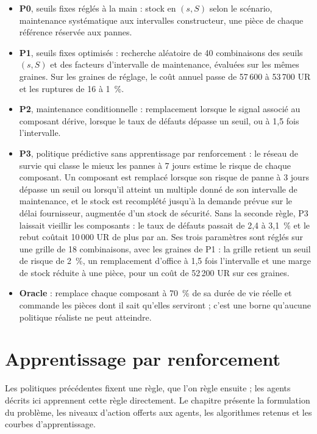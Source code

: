\documentclass[11pt,a4paper,oneside]{report}
\begin{document}
\begin{itemize}
\item \textbf{P0}, seuils fixes réglés à la main : stock en $(s,S)$ selon le scénario, maintenance systématique aux intervalles constructeur, une pièce de chaque référence réservée aux pannes.
\item \textbf{P1}, seuils fixes optimisés : recherche aléatoire de 40 combinaisons des seuils $(s,S)$ et des facteurs d'intervalle de maintenance, évaluées sur les mêmes graines. Sur les graines de réglage, le coût annuel passe de 57\,600 à 53\,700 UR et les ruptures de 16 à 1~\%.
\item \textbf{P2}, maintenance conditionnelle : remplacement lorsque le signal associé au composant dérive, lorsque le taux de défauts dépasse un seuil, ou à 1,5 fois l'intervalle.
\item \textbf{P3}, politique prédictive sans apprentissage par renforcement : le réseau de survie qui classe le mieux les pannes à 7 jours estime le risque de chaque composant. Un composant est remplacé lorsque son risque de panne à 3 jours dépasse un seuil ou lorsqu'il atteint un multiple donné de son intervalle de maintenance, et le stock est recomplété jusqu'à la demande prévue sur le délai fournisseur, augmentée d'un stock de sécurité. Sans la seconde règle, P3 laissait vieillir les composants : le taux de défauts passait de 2,4 à 3,1~\% et le rebut coûtait 10\,000 UR de plus par an. Ses trois paramètres sont réglés sur une grille de 18 combinaisons, avec les graines de P1 : la grille retient un seuil de risque de 2~\%, un remplacement d'office à 1,5 fois l'intervalle et une marge de stock réduite à une pièce, pour un coût de 52\,200 UR sur ces graines.
\item \textbf{Oracle} : remplace chaque composant à 70~\% de sa durée de vie réelle et commande les pièces dont il sait qu'elles serviront ; c'est une borne qu'aucune politique réaliste ne peut atteindre.
\end{itemize}

\section{Apprentissage par renforcement}\label{sec:apprentissage}

Les politiques précédentes fixent une règle, que l'on règle ensuite ; les agents décrits ici apprennent cette règle directement. Le chapitre présente la formulation du problème, les niveaux d'action offerts aux agents, les algorithmes retenus et les courbes d'apprentissage.
\end{document}
